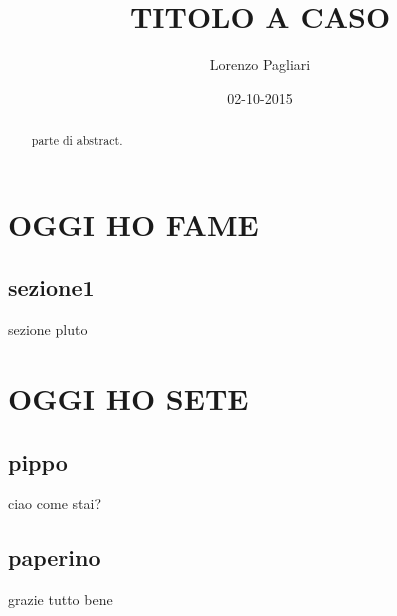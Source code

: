 \documentclass[a4paper, 12pt, oneside]{report}
\title{TITOLO A CASO}
\author{Lorenzo Pagliari}
\date{02-10-2015}
\begin{document}
\maketitle
	
	\begin{abstract}
		parte di abstract.
	\end{abstract}
	
	\tableofcontents
	
\chapter{OGGI HO FAME}
\section{sezione1}
	sezione pluto

\chapter{OGGI HO SETE}
\section{pippo}
ciao come stai?
\section{paperino}
grazie tutto bene
	
	
	
\end{document}
